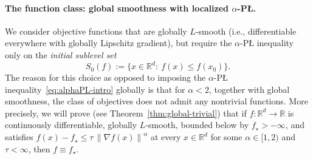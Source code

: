 \documentclass[11pt]{article}
\newcommand{\R}{\mathbb{R}}
\newcommand{\norm}[1]{\left\lVert #1\right\rVert}
\begin{document}

\paragraph{The function class: global smoothness with localized $\alpha$-P\L{}.}
We consider objective functions that are globally $L$-smooth (i.e., differentiable everywhere with globally Lipschitz
gradient), but require the $\alpha$-P\L{} inequality only on the \emph{initial sublevel set}
\[
S_0(f):=\{x\in\R^d:\ f(x)\le f(x_0)\}.
\]
The reason for this choice as opposed to imposing the $\alpha$-P\L{}
inequality~\eqref{eq:alphaPL-intro} globally is that for $\alpha<2$, together with global smoothness, the class of objectives does not admit any
nontrivial functions. More precisely, we will prove
(see Theorem~\ref{thm:global-trivial}) that
if $f:\R^d\to\R$ is continuously differentiable, globally $L$-smooth, bounded below by $f_\star>-\infty$, and
satisfies $f(x)-f_\star\le\tau\,\norm{\nabla f(x)}^\alpha$ at every $x\in\R^d$ for some $\alpha\in[1,2)$ and
$\tau<\infty$, then $f\equiv f_\star$.
\end{document}
